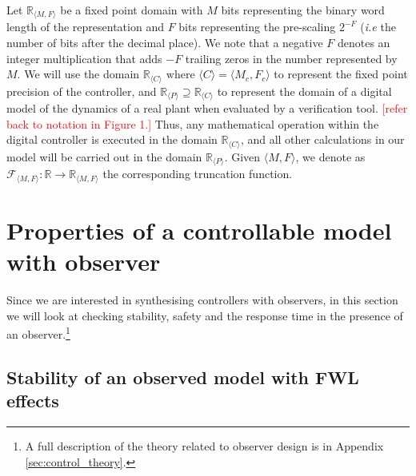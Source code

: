 \documentclass[sigconf]{llncs}
\renewcommand{\note}[1]{\textcolor{red}{[#1]}}
\begin{document}
Let $\mathbb{R}_{\langle M,F \rangle}$ be a fixed point domain with $M$ bits
representing the binary word length of the representation and $F$ bits
representing the pre-scaling $2^{-F}$ (\emph{i.e} the number of bits after
the decimal place).  We note that a negative $F$ denotes an integer
multiplication that adds $-F$ trailing zeros in the number represented by
$M$. 
We will use the domain $\mathbb{R}_{\langle C \rangle} \text{ where } \langle C \rangle = \langle M_c,F_c \rangle$
to represent the fixed point precision of the controller, and 
$\mathbb{R}_{\langle P \rangle} \supseteq \mathbb{R}_{\langle C \rangle}$
to represent the domain of a digital model of the dynamics of a real plant when
evaluated by a verification tool. \note{refer back to notation in Figure 1.}
Thus, any mathematical operation within the digital controller is executed in the
domain $\mathbb{R}_{\langle C \rangle}$, and all other calculations
in our model will be carried out in the domain $\mathbb{R}_{\langle P \rangle}$.
Given ${\langle M,F \rangle}$, 
we denote as $\mathcal{F}_{\langle M,F \rangle} : \mathbb{R} \rightarrow \mathbb{R}_{\langle M,F \rangle}$ the corresponding truncation function. 

\section{Properties of a controllable model with observer}\label{sec:cof_verification}

Since we are interested in synthesising controllers with observers, 
in this section we will look at checking stability, safety and the response time in the presence of an observer.\footnote{A full description of
the theory related to observer design is in Appendix \ref{sec:control_theory}.}

\subsection{Stability of an observed model with FWL effects}\label{sec:cof_fwl_stability}
\end{document}
